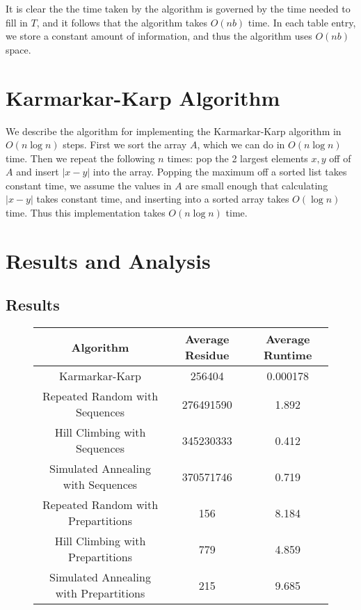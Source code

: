 \documentclass[10pt,letter]{article}
\begin{document}
It is clear the the time taken by the algorithm is governed by the time needed to fill in $T$, and it follows that the algorithm takes $O(nb)$ time. In each table entry, we store a constant amount of information, and thus the algorithm uses $O(nb)$ space. 

\section{Karmarkar-Karp Algorithm}

We describe the algorithm for implementing the Karmarkar-Karp algorithm in $O(n\log{n})$ steps. First we sort the array $A$, which we can do in $O(n\log{n})$ time. Then we repeat the following $n$ times: pop the 2 largest elements $x,y$ off of $A$ and insert $|x-y|$ into the array. Popping the maximum off a sorted list takes constant time, we assume the values in $A$ are small enough that calculating $|x-y|$ takes constant time, and inserting into a sorted array takes $O(\log{n})$ time. Thus this implementation takes $O(n\log{n})$ time.

\section{Results and Analysis}

\subsection{Results}

\begin{figure}[h]
  \centering
  \begin{tabular}{|c|c|c|}
    \hline
    Algorithm & Average Residue & Average Runtime \\
    \hline
    Karmarkar-Karp & 256404 & 0.000178 \\
    \hline
    Repeated Random with Sequences & 276491590 & 1.892 \\
    \hline
    Hill Climbing with Sequences & 345230333 & 0.412 \\
    \hline
    Simulated Annealing with Sequences & 370571746 & 0.719 \\
    \hline
    Repeated Random with Prepartitions & 156 & 8.184 \\
    \hline
    Hill Climbing with Prepartitions & 779 & 4.859 \\
    \hline
    Simulated Annealing with Prepartitions & 215 & 9.685 \\
    \hline
    
  \end{tabular}
\end{figure}
\end{document}
